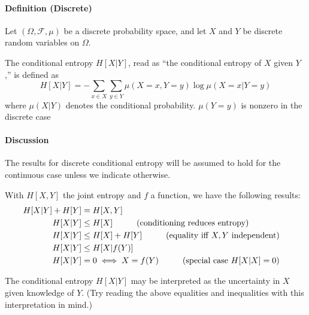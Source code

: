 \documentclass[12pt]{article}
\begin{document}
\paragraph{Definition (Discrete)}
Let $(\Omega, \mathcal{F}, \mu)$ be a discrete probability space, and let $X$ and $Y$ be discrete random variables on $\Omega$.

The conditional entropy $H[X|Y]$, read as ``the conditional entropy of $X$ given $Y$,'' is defined as
\begin{equation}
H[X|Y] = -\sum_{x \in X}\sum_{y \in Y} \mu(X=x,Y=y) \log \mu(X=x|Y=y)
\end{equation}
where $\mu(X|Y)$ denotes the conditional probability. $\mu(Y=y)$ is nonzero in the
discrete case

\paragraph{Discussion}
The results for discrete conditional entropy will be assumed to hold for the continuous case unless we indicate otherwise.

With $H[X,Y]$ the joint entropy and $f$ a function, we have the following results:
\begin{align}
H[X|Y] + H[Y]&= H[X,Y]&\\
H[X|Y] &\le H[X] \hspace{10mm}\text{(conditioning reduces entropy)}\\
H[X|Y] &\le H[X] + H[Y] \hspace{10mm}\text{(equality iff } X, Y \text{ independent)}\\
H[X|Y] &\le H[X|f(Y)]&\\
H[X|Y] &= 0 \iff X=f(Y)\hspace{10mm}\text{(special case } H[X|X] = 0 \text{)}\\
\end{align}

The conditional entropy $H[X|Y]$ may be interpreted as the uncertainty in $X$ given knowledge of $Y$.  (Try reading the above equalities and inequalities with this interpretation in mind.)

\end{document}
